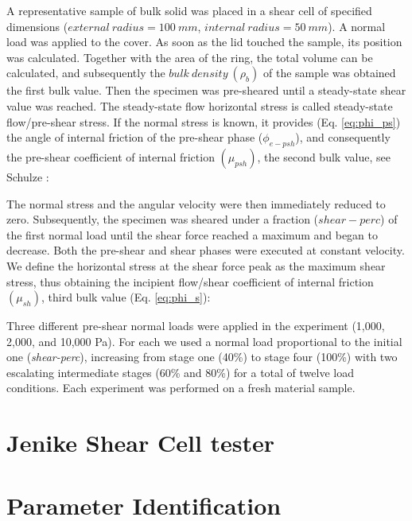A representative sample of bulk solid was placed in a shear cell of specified
dimensions ($external ~ radius = 100 ~ mm$, $internal ~ radius = 50 ~ mm$).
A normal load was applied to the cover. As soon as the lid touched the sample,
its position was calculated.
Together with the area of the ring, the total volume can be calculated, and subsequently the $bulk ~ density ~ (\rho_b)$ 
of the sample was obtained the first bulk value.
Then the specimen was pre-sheared until a steady-state shear value was reached.
The steady-state flow horizontal stress
is called steady-state flow/pre-shear stress.
If the normal stress is known, it provides (Eq. \ref{eq:phi_ps}) the angle of
internal friction of the pre-shear phase ($\phi_{e-psh}$), and consequently the
pre-shear coefficient of internal friction $ (\mu_{psh})$, the second
bulk value, see Schulze \cite{RefWorks:118}:

The normal stress and the angular velocity were then immediately reduced to zero. 
Subsequently, the specimen was sheared under a fraction ($shear-perc$) of the first normal load until the shear force 
reached a maximum and began to decrease. 
Both the pre-shear and shear phases were executed at constant velocity. 
We define the horizontal stress at the shear force peak as the maximum shear
stress, thus obtaining the incipient flow/shear coefficient of internal friction $
(\mu_{sh})$, third bulk value (Eq. \ref{eq:phi_s})\cite{RefWorks:118}:

Three different pre-shear normal loads were applied in the experiment
(1,000, 2,000, and 10,000 Pa).
For each we used a normal load proportional to the initial one
(\textit{shear-perc}), increasing from stage one (40\%) to stage four (100\%)
with two escalating intermediate stages (60\% and 80\%) for a total of twelve load conditions.
Each experiment was performed on a fresh material sample. \\

\section{Jenike Shear Cell tester}
\label{sec:jsct}


\section{Parameter Identification}
\label{sec:parameteridentification}

